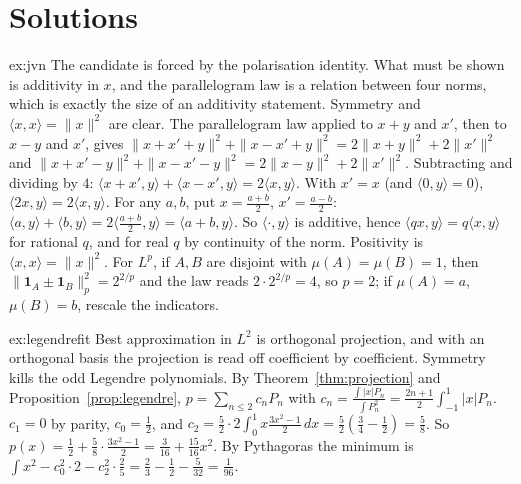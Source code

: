 \section{Solutions}

\begin{solution}{ex:jvn}
\idea The candidate is forced by the polarisation identity. What must be shown is additivity in $x$, and the parallelogram law is a relation between four norms, which is exactly the size of an additivity statement.
\writeup Symmetry and $\langle x,x\rangle=\|x\|^2$ are clear. The parallelogram law applied to $x+y$ and $x'$, then to $x-y$ and $x'$, gives
$\|x+x'+y\|^2+\|x-x'+y\|^2=2\|x+y\|^2+2\|x'\|^2$ and $\|x+x'-y\|^2+\|x-x'-y\|^2=2\|x-y\|^2+2\|x'\|^2$. Subtracting and dividing by $4$:
$\langle x+x',y\rangle+\langle x-x',y\rangle=2\langle x,y\rangle$. With $x'=x$ (and $\langle0,y\rangle=0$), $\langle2x,y\rangle=2\langle x,y\rangle$. For any $a,b$, put $x=\frac{a+b}2$, $x'=\frac{a-b}2$: $\langle a,y\rangle+\langle b,y\rangle=2\langle\frac{a+b}2,y\rangle=\langle a+b,y\rangle$.
So $\langle\cdot,y\rangle$ is additive, hence $\langle qx,y\rangle=q\langle x,y\rangle$ for rational $q$, and for real $q$ by continuity of the norm. Positivity is $\langle x,x\rangle=\|x\|^2$. For $L^p$, if $A,B$ are disjoint with
$\mu(A)=\mu(B)=1$, then $\|\mathbf 1_A\pm\mathbf 1_B\|_p^2=2^{2/p}$ and the law reads $2\cdot2^{2/p}=4$, so $p=2$; if $\mu(A)=a$, $\mu(B)=b$, rescale the indicators.
\end{solution}

\begin{solution}{ex:legendrefit}
\idea Best approximation in $L^2$ is orthogonal projection, and with an orthogonal basis the projection is read off coefficient by coefficient. Symmetry kills the odd Legendre polynomials.
\writeup By Theorem~\ref{thm:projection} and Proposition~\ref{prop:legendre}, $p=\sum_{n\le2}c_nP_n$ with $c_n=\frac{\int|x|P_n}{\int P_n^2}=\frac{2n+1}2\int_{-1}^1|x|P_n$. $c_1=0$ by parity, $c_0=\frac12$, and
$c_2=\frac52\cdot2\int_0^1x\frac{3x^2-1}2\,dx=\frac52(\frac34-\frac12)=\frac58$. So $p(x)=\frac12+\frac58\cdot\frac{3x^2-1}2=\frac3{16}+\frac{15}{16}x^2$. By Pythagoras the minimum is
$\int x^2-c_0^2\cdot2-c_2^2\cdot\frac25=\frac23-\frac12-\frac5{32}=\frac1{96}$.
\end{solution}

